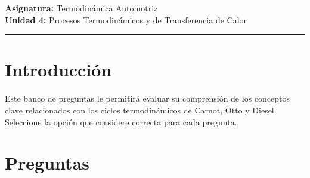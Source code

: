 \documentclass{article}
\begin{document}

\textbf{Asignatura:} Termodinámica Automotriz \\
\textbf{Unidad 4:} Procesos Termodinámicos y de Transferencia de Calor

\vspace{5mm}
\hrule
\vspace{5mm}

\section*{Introducción}

Este banco de preguntas le permitirá evaluar su comprensión de los conceptos clave relacionados con los ciclos termodinámicos de Carnot, Otto y Diesel. Seleccione la opción que considere correcta para cada pregunta.

\section*{Preguntas}
\end{document}
